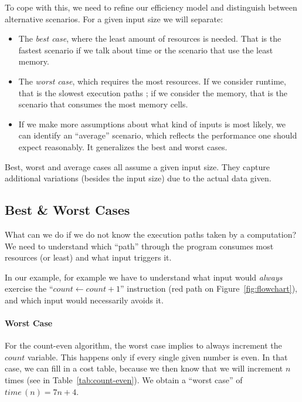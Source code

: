 \documentclass{aldast}
\begin{document}
To cope with this, we need to refine our efficiency model and
distinguish between alternative scenarios. For a given input size we
will separate:
\begin{itemize}
\item The \emph{best case}, where the least amount of resources is
  needed. That is the fastest scenario if we talk about time or the
  scenario that use the least memory.
\item The \emph{worst case}, which requires the most resources. If we
  consider runtime, that is the slowest execution paths ; if we
  consider the memory, that is the scenario that consumes the most
  memory cells.
\item If we make more assumptions about what kind of inputs is most
  likely, we can identify an ``average'' scenario, which reflects the
  performance one should expect reasonably. It generalizes the best
  and worst cases.
\end{itemize}

\begin{takeaway}
  Best, worst and average cases all assume a given input size. They
  capture additional variations (besides the input size) due to the
  actual data given.
\end{takeaway}


\subsection{Best \& Worst Cases}

What can we do if we do not know the execution paths taken by a
computation? We need to understand which ``path'' through the program
consumes most resources (or least) and what input triggers it.

In our example, for example we have to understand what input would
\emph{always} exercise the ``$count \gets count + 1$'' instruction
(red path on Figure~\ref{fig:flowchart}), and which input would
necessarily avoids it.

\paragraph{Worst Case} For the count-even algorithm, the worst case
implies to always increment the $count$ variable. This happens only if
every single given number is even. In that case, we can fill in a cost
table, because we then know that we will increment $n$ times (see in
Table~\ref{tab:count-even}). We obtain a ``worst case'' of
$time\,(n)=7n+4$.
\end{document}
